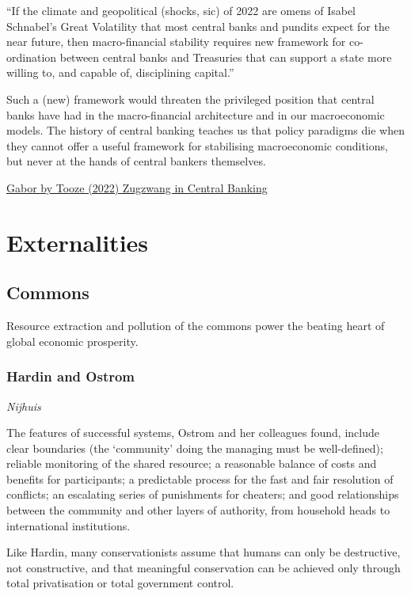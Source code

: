 \documentclass[
]{book}
\begin{document}
``If the climate and geopolitical (shocks, sic) of 2022 are omens of Isabel Schnabel's Great Volatility that most central banks and pundits expect for the near future, then macro-financial stability requires new framework for co-ordination between central banks and Treasuries that can support a state more willing to, and capable of, disciplining capital.''

Such a (new) framework would threaten the privileged position that central banks have had in the macro-financial architecture and in our macroeconomic models. The history of central banking teaches us that policy paradigms die when they cannot offer a useful framework for stabilising macroeconomic conditions, but never at the hands of central bankers themselves.

\href{https://adamtooze.substack.com/p/chartbook-151-zugzwang-are-we-on}{Gabor by Tooze (2022) Zugzwang in Central Banking}

\hypertarget{externalities}{%
\chapter{Externalities}\label{externalities}}

\hypertarget{commons}{%
\section{Commons}\label{commons}}

Resource extraction and pollution of the commons
power the beating heart of global economic prosperity.

\hypertarget{hardin-and-ostrom}{%
\subsection{Hardin and Ostrom}\label{hardin-and-ostrom}}

\emph{Nijhuis}

The features of successful systems, Ostrom and her colleagues found, include clear boundaries (the `community' doing the managing must be well-defined); reliable monitoring of the shared resource; a reasonable balance of costs and benefits for participants; a predictable process for the fast and fair resolution of conflicts; an escalating series of punishments for cheaters; and good relationships between the community and other layers of authority, from household heads to international institutions.

Like Hardin, many conservationists assume that humans can only be destructive, not constructive, and that meaningful conservation can be achieved only through total privatisation or total government control.
\end{document}
